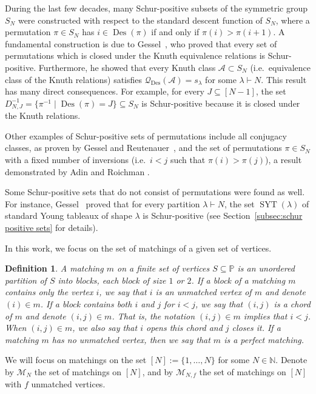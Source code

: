 \documentclass[11pt]{article}
\newtheorem{definition}[theo]{Definition}
\theoremstyle{definition}
\providecommand{\ie}{i.e.\ }
\numberwithin{equation}{section}
\newcommand{\Des}{\operatorname{Des}}
\newcommand{\Syt}{\operatorname{SYT}}
\newcommand{\NN}{\mathbb{N}}
\newcommand{\PP}{\mathbb{P}}
\newcommand{\Q}{\mathcal{Q}}
\newcommand{\A}{\mathcal{A}}
\newcommand{\M}{\mathcal{M}}
\begin{document}
During the last few decades, many Schur-positive subsets of the symmetric group $S_N$ were constructed with respect to the standard descent function of $S_N$, where a permutation $\pi \in S_N$ has $i \in \Des(\pi)$ if and only if $\pi(i) > \pi(i+1)$. A fundamental construction is due to Gessel~\cite{knuth_classes_schur_positive}, who proved that every set of permutations which is closed under the Knuth equivalence relations is Schur-positive. Furthermore, he showed that every Knuth class $\A \subset S_N$ (\ie equivalence class of the Knuth relations) satisfies $\Q_{\Des}(\A) = s_\lambda$ for some $\lambda \vdash N$. This result has many direct consequences. For example, for every $J \subseteq [N-1]$, the set $D_{N,J}^{-1} = \{ \pi^{-1} \mid \Des(\pi)=J\} \subseteq S_N$ is Schur-positive because it is closed under the Knuth relations.

Other examples of Schur-positive sets of permutations include all conjugacy classes, as proven by Gessel and Reutenauer~\cite{gessel1993counting}, and the set of permutations $\pi \in S_N$ with a fixed number of inversions (\ie $i<j$ such that $\pi(i) > \pi(j)$), a result demonstrated by Adin and Roichman \cite[Prop.\ 9.5]{adin_roichman_fine_set}.

Some Schur-positive sets that do not consist of permutations were found as well. For instance, Gessel~\cite{knuth_classes_schur_positive} proved that for every partition $\lambda \vdash N$, the set $\Syt(\lambda)$ of standard Young tableaux of shape $\lambda$ is Schur-positive (see Section~\ref{subsec:schur positive sets} for details).

In this work, we focus on the set of matchings of a given set of vertices.
\begin{definition}
\label{def:matching}
    A matching $m$ on a finite set of vertices $S \subseteq \PP$ is an unordered partition of $S$ into blocks, each block of size $1$ or $2$. If a block of a matching $m$ contains only the vertex $i$, we say that $i$ is an \emph{unmatched vertex} of $m$ and denote $(i) \in m$. If a block contains both $i$ and $j$ for $i<j$, we say that $(i,j)$ is a \emph{chord} of $m$ and denote $(i,j) \in m$. That is, the notation $(i,j)\in m$ implies that $i<j$. When $(i,j) \in m$, we also say that $i$ opens this chord and $j$ closes it. If a matching $m$ has no unmatched vertex, then we say that $m$ is a perfect matching.
\end{definition}

We will focus on matchings on the set $[N] := \{1,\dots, N\}$ for some $N \in \NN$. Denote by $\M_N$ the set of matchings on $[N]$, and by $\M_{N,f}$ the set of matchings on $[N]$ with $f$ unmatched vertices.
\end{document}

